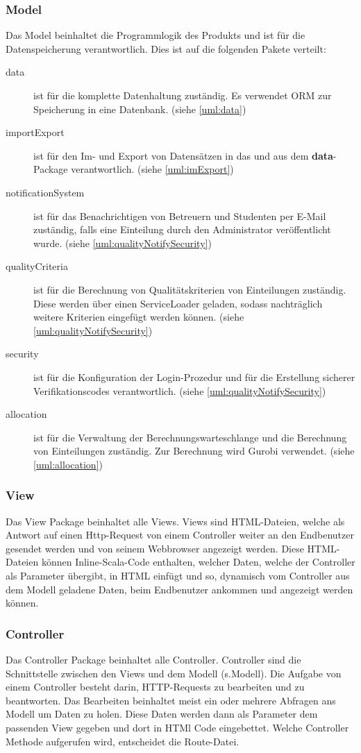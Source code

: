 \documentclass[parskip=full]{scrartcl}
\begin{document}
\subsubsection{Model}
Das Model beinhaltet die Programmlogik des Produkts und ist für die
Datenspeicherung verantwortlich. Dies ist auf die folgenden Pakete
verteilt:
\begin{description}
\item[data] ist für die komplette Datenhaltung zuständig. Es verwendet ORM zur
Speicherung in eine Datenbank. (siehe \autoref{uml:data})
\item[importExport] ist für den Im- und Export von Datensätzen in das und aus dem
\textsf{\textbf{data}}-Package verantwortlich. (siehe \autoref{uml:imExport})
\item[notificationSystem] ist für das Benachrichtigen von Betreuern und
Studenten per E-Mail zuständig, falls eine Einteilung durch den Administrator
veröffentlicht wurde. (siehe \autoref{uml:qualityNotifySecurity})
\item[qualityCriteria] ist für die Berechnung von Qualitätskriterien von
Einteilungen zuständig. Diese werden über einen ServiceLoader geladen, sodass
nachträglich weitere Kriterien eingefügt werden können.
(siehe \autoref{uml:qualityNotifySecurity})
\item[security] ist für die Konfiguration der Login-Prozedur und für die
Erstellung sicherer Verifikationscodes verantwortlich. (siehe
\autoref{uml:qualityNotifySecurity})
\item[allocation] ist für die Verwaltung der Berechnungswarteschlange und die
Berechnung von Einteilungen zuständig. Zur Berechnung wird Gurobi verwendet.
(siehe \autoref{uml:allocation})
\end{description}

   \subsubsection{View}
   Das View Package beinhaltet alle Views. Views sind HTML-Dateien, welche als Antwort auf einen Http-Request von einem Controller weiter an den Endbenutzer gesendet werden und von seinem Webbrowser angezeigt werden. Diese HTML-Dateien können Inline-Scala-Code enthalten, welcher Daten, welche der Controller als Parameter übergibt, in HTML einfügt und so, dynamisch vom Controller aus dem Modell geladene Daten, beim Endbenutzer ankommen und angezeigt werden können.
\subsubsection{Controller}
Das Controller Package beinhaltet alle Controller. Controller sind die Schnittstelle zwischen den Views und dem Modell (s.Modell). Die Aufgabe von einem Controller besteht darin, HTTP-Requests zu bearbeiten und zu beantworten. Das Bearbeiten beinhaltet meist ein oder mehrere Abfragen ans Modell um Daten zu holen. Diese Daten werden dann als Parameter dem passenden View gegeben und dort in HTMl Code eingebettet. Welche Controller Methode aufgerufen wird, entscheidet die Route-Datei.
\end{document}
